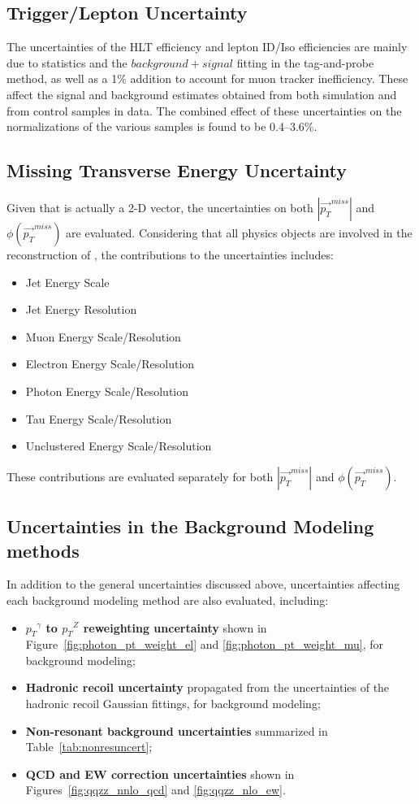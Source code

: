 \subsection{Trigger/Lepton Uncertainty}
The uncertainties of the HLT efficiency and lepton ID/Iso efficiencies are mainly due to statistics and the $background+signal$ fitting in the tag-and-probe method, as well as a 1\% addition to account for muon tracker inefficiency. These affect the signal and background estimates obtained from both simulation and from control samples in data. The combined effect of these uncertainties on the normalizations of the various samples is found to be 0.4--3.6\%.

\subsection{Missing Transverse Energy Uncertainty}
Given that \ptmiss is actually a 2-D vector, the uncertainties on both $|{\vec{p_{T}}^{miss}}|$ and $\phi({\vec{p_{T}}}^{miss})$ are evaluated. Considering that all physics objects are involved in the reconstruction of \ptmiss, the contributions to the \ptmiss uncertainties includes:
\begin{itemize}
\item Jet Energy Scale
\item Jet Energy Resolution
\item Muon Energy Scale/Resolution
\item Electron Energy Scale/Resolution
\item Photon Energy Scale/Resolution
\item Tau Energy Scale/Resolution
\item Unclustered Energy Scale/Resolution
\end{itemize}

These contributions are evaluated separately for both $|{\vec{p_{T}}^{miss}}|$ and $\phi({\vec{p_{T}}}^{miss})$.
\subsection{Uncertainties in the Background Modeling methods}
In addition to the general uncertainties discussed above, uncertainties affecting each background modeling method are also evaluated, including:
\begin{itemize}
\item \textbf{${p_T}^{\gamma}$ to ${p_T}^Z$ reweighting uncertainty} shown in Figure~\ref{fig:photon_pt_weight_el} and \ref{fig:photon_pt_weight_mu}, for \Zjets background modeling;
\item \textbf{Hadronic recoil uncertainty} propagated from the uncertainties of the hadronic recoil Gaussian fittings, for \Zjets background modeling;
\item \textbf{Non-resonant background uncertainties} summarized in Table~\ref{tab:nonresuncert};
\item \textbf{QCD and EW correction uncertainties} shown in Figures~\ref{fig:qqzz_nnlo_qcd} and \ref{fig:qqzz_nlo_ew}.
\end{itemize}

